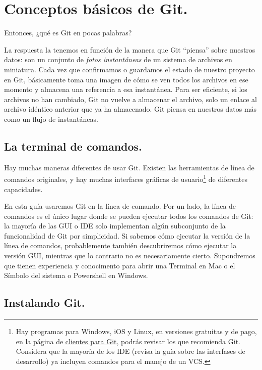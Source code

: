 \section{Conceptos básicos de Git.}

Entonces, ¿qué es Git en pocas palabras?
\par
La respuesta la tenemos en función de la manera que Git \enquote{piensa} sobre nuestros datos: son un conjunto de \emph{fotos instantáneas} de un sistema de archivos en miniatura. Cada vez que confirmamos o guardamos el estado de nuestro proyecto en Git, básicamente toma una imagen de cómo se ven todos los archivos en ese momento y almacena una referencia a esa instantánea. Para ser eficiente, si los archivos no han cambiado, Git no vuelve a almacenar el archivo, solo un enlace al archivo idéntico anterior que ya ha almacenado. Git piensa en nuestros datos más como un flujo de instantáneas.

\subsection{La terminal de comandos.}

Hay muchas maneras diferentes de usar Git. Existen las herramientas de línea de comandos originales, y hay muchas interfaces gráficas de usuario\footnote{Hay programas para Windows, iOS y Linux, en versiones gratuitas y de pago, en la página de \href{https://git-scm.com/downloads/guis/}{clientes para Git}, podrás revisar los que recomienda Git. Considera que la mayoría de los IDE (revisa la guía sobre las interfases de desarrollo) ya incluyen comandos para el manejo de un VCS.} de diferentes capacidades.
\par
En esta guía usaremos Git en la línea de comando. Por un lado, la línea de comandos es el único lugar donde se pueden ejecutar todos los comandos de Git: la mayoría de las GUI o IDE solo implementan algún subconjunto de la funcionalidad de Git por simplicidad. Si sabemos cómo ejecutar la versión de la línea de comandos, probablemente también descubriremos cómo ejecutar la versión GUI, mientras que lo contrario no es necesariamente cierto. Supondremos que tienen experiencia y conocimento para abrir una Terminal en Mac o el Símbolo del sistema o Powershell en Windows.

\subsection{Instalando Git.}


